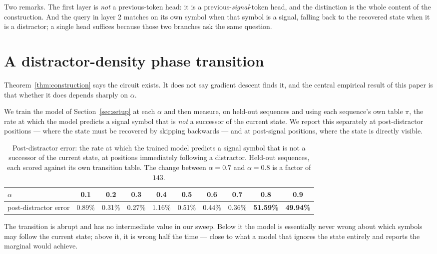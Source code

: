 Two remarks. The first layer is \emph{not} a previous-token head: it is a previous-\emph{signal}-token
head, and the distinction is the whole content of the construction. And the query in layer 2
matches on its own symbol when that symbol is a signal, falling back to the recovered state when it
is a distractor; a single head suffices because those two branches ask the same question.

\section{A distractor-density phase transition}
\label{sec:transition}

Theorem~\ref{thm:construction} says the circuit exists. It does not say gradient descent finds it,
and the central empirical result of this paper is that whether it does depends sharply on
$\alpha$.

We train the model of Section~\ref{sec:setup} at each $\alpha$ and then measure, on held-out
sequences and using each sequence's own table $\pi$, the rate at which the model predicts a signal
symbol that is \emph{not} a successor of the current state. We report this separately at
post-distractor positions --- where the state must be recovered by skipping backwards --- and at
post-signal positions, where the state is directly visible.

\begin{table}[!ht]
\caption{Post-distractor error: the rate at which the trained model predicts a signal symbol that
is not a successor of the current state, at positions immediately following a distractor.
Held-out sequences, each scored against its own transition table. The change between
$\alpha=0.7$ and $\alpha=0.8$ is a factor of $143$.}
\label{tab:transition}
\begin{center}
\begin{tabular}{lccccccccc}
\toprule
$\alpha$ & 0.1 & 0.2 & 0.3 & 0.4 & 0.5 & 0.6 & 0.7 & 0.8 & 0.9 \\
\midrule
post-distractor error & 0.89\% & 0.31\% & 0.27\% & 1.16\% & 0.51\% & 0.44\% & 0.36\%
  & \textbf{51.59\%} & \textbf{49.94\%} \\
\bottomrule
\end{tabular}
\end{center}
\end{table}

The transition is abrupt and has no intermediate value in our sweep. Below it the model is
essentially never wrong about which symbols may follow the current state; above it, it is wrong
half the time --- close to what a model that ignores the state entirely and reports the marginal
would achieve.

